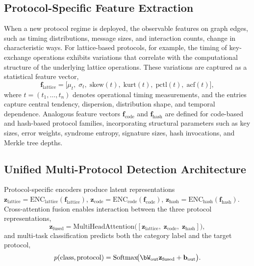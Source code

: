 \subsection{Protocol-Specific Feature Extraction}

When a new protocol regime is deployed, the observable features on graph edges, such as timing distributions, message sizes, and interaction counts, change in characteristic ways. For lattice-based protocols, for example, the timing of key-exchange operations exhibits variations that correlate with the computational structure of the underlying lattice operations. These variations are captured as a statistical feature vector,
\begin{equation}
\mathbf{f}_{\mathrm{lattice}}
= \bigl[\mu_t,\;\sigma_t,\;\mathrm{skew}(t),\;\mathrm{kurt}(t),\;
  \mathrm{pctl}(t),\;\mathrm{acf}(t)\bigr],
\label{eq:pq_feat_lattice}
\end{equation}
where $t=(t_1,\dots,t_n)$ denotes operational timing measurements, and the entries capture central tendency, dispersion, distribution shape, and temporal dependence. Analogous feature vectors $\mathbf{f}_{\mathrm{code}}$ and $\mathbf{f}_{\mathrm{hash}}$ are defined for code-based and hash-based protocol families, incorporating structural parameters such as key sizes, error weights, syndrome entropy, signature sizes, hash invocations, and Merkle tree depths.

\subsection{Unified Multi-Protocol Detection Architecture}

Protocol-specific encoders produce latent representations $\mathbf{z}_{\mathrm{lattice}}=\mathrm{ENC}_{\mathrm{lattice}}(\mathbf{f}_{\mathrm{lattice}})$, $\mathbf{z}_{\mathrm{code}}=\mathrm{ENC}_{\mathrm{code}}(\mathbf{f}_{\mathrm{code}})$, $\mathbf{z}_{\mathrm{hash}}=\mathrm{ENC}_{\mathrm{hash}}(\mathbf{f}_{\mathrm{hash}})$. Cross-attention fusion enables interaction between the three protocol representations,
\begin{equation}
\mathbf{z}_{\mathrm{fused}}
= \mathrm{MultiHeadAttention}\!\bigl(
  [\mathbf{z}_{\mathrm{lattice}},\;
   \mathbf{z}_{\mathrm{code}},\;
   \mathbf{z}_{\mathrm{hash}}]\bigr),
\label{eq:pq_fusion}
\end{equation}
and multi-task classification predicts both the category label and the target protocol,
\begin{equation}
p(\mathrm{class},\mathrm{protocol})
= \mathrm{Softmax}\!\bigl(\bW_{\mathrm{out}}\mathbf{z}_{\mathrm{fused}}
  + \mathbf{b}_{\mathrm{out}}\bigr).
\label{eq:pq_class}
\end{equation}

